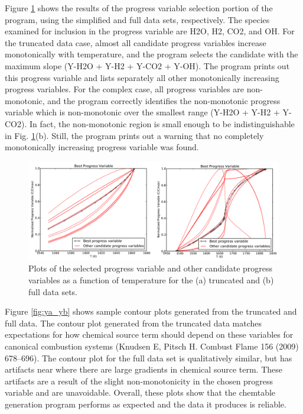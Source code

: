 \documentclass[11pt]{article}
\begin{document}
Figure \ref{fig:xa_xb} shows the results of the progress variable selection portion of the program, using the simplified and full data sets, respectively. The species examined for inclusion in the progress variable are H2O, H2, CO2, and OH. For the truncated data case, almost all candidate progress variables increase monotonically with temperature, and the program selects the candidate with the maximum slope (Y-H2O + Y-H2 + Y-CO2 + Y-OH). The program prints out this progress variable and lists separately all other monotonically increasing progress variables. For the complex case, all progress variables are non-monotonic, and the program correctly identifies the non-monotonic progress variable which is non-monotonic over the smallest range (Y-H2O + Y-H2 + Y-CO2). In fact, the non-monotonic region is small enough to be indistinguishable in Fig. \ref{fig:xa_xb}(b). Still, the program prints out a warning that no completely monotonically increasing progress variable was found.

\begin{figure} [h]
\centering
\includegraphics[width=\textwidth]{xa_xb}
\caption{\label{fig:xa_xb} Plots of the selected progress variable and other candidate progress variables as a function of temperature for the (a) truncated and (b) full data sets.
}
\end{figure}

Figure \ref{fig:ya_yb} shows sample contour plots generated from the truncated and full data. The contour plot generated from the truncated data matches expectations for how chemical source term should depend on these variables for canonical combustion systems (Knudsen E, Pitsch H. Combust Flame  156 (2009) 678–696). The contour plot for the full data set is qualitatively similar, but has artifacts near where there are large gradients in chemical source term. These artifacts are a result of the slight non-monotonicity in the chosen progress variable and are unavoidable. Overall, these plots show that the chemtable generation program performs as expected and the data it produces is reliable. 
\end{document}
